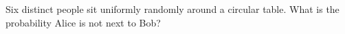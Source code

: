 Six distinct people sit uniformly randomly around a circular table. What is the probability Alice is not next to Bob?
